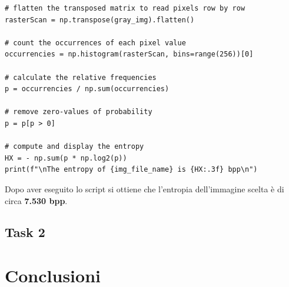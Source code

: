 \begin{lstlisting}
# flatten the transposed matrix to read pixels row by row
rasterScan = np.transpose(gray_img).flatten()

# count the occurrences of each pixel value
occurrencies = np.histogram(rasterScan, bins=range(256))[0]

# calculate the relative frequencies
p = occurrencies / np.sum(occurrencies)

# remove zero-values of probability
p = p[p > 0]

# compute and display the entropy
HX = - np.sum(p * np.log2(p))
print(f"\nThe entropy of {img_file_name} is {HX:.3f} bpp\n")
\end{lstlisting}

\noindent Dopo aver eseguito lo script si ottiene che l'entropia dell'immagine scelta è di circa \textbf{7.530 bpp}.

\subsection*{Task 2}








\section{Conclusioni}


